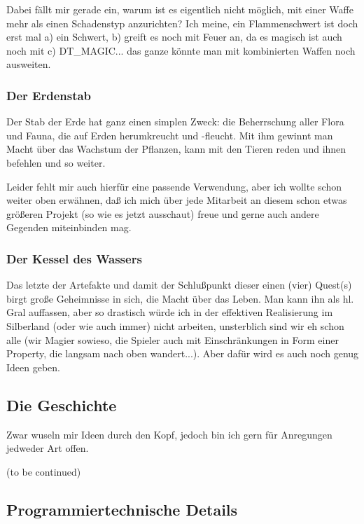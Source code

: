 \documentclass[10pt,a4paper,oneside,onecolumn]{article}
\begin{document}
Dabei fällt mir gerade ein, warum ist es eigentlich nicht möglich,
mit einer Waffe mehr als einen Schadenstyp anzurichten? Ich meine,
ein Flammenschwert ist doch erst mal a) ein Schwert, b) greift es
noch mit Feuer an, da es magisch ist auch noch mit c) DT\_MAGIC...
das ganze könnte man mit kombinierten Waffen noch ausweiten.


\subsubsection{Der Erdenstab}

Der Stab der Erde hat ganz einen simplen Zweck: die Beherrschung aller
Flora und Fauna, die auf Erden herumkreucht und -fleucht. Mit ihm
gewinnt man Macht über das Wachstum der Pflanzen, kann mit den Tieren
reden und ihnen befehlen und so weiter.

Leider fehlt mir auch hierfür eine passende Verwendung, aber ich wollte
schon weiter oben erwähnen, daß ich mich über jede Mitarbeit an diesem
schon etwas größeren Projekt (so wie es jetzt ausschaut) freue und
gerne auch andere Gegenden miteinbinden mag.


\subsubsection{Der Kessel des Wassers}

Das letzte der Artefakte und damit der Schlußpunkt dieser einen (vier)
Quest(s) birgt große Geheimnisse in sich, die Macht über das Leben.
Man kann ihn als hl. Gral auffassen, aber so drastisch würde ich in
der effektiven Realisierung im Silberland (oder wie auch immer) nicht
arbeiten, unsterblich sind wir eh schon alle (wir Magier sowieso,
die Spieler auch mit Einschränkungen in Form einer Property, die langsam
nach oben wandert...). Aber dafür wird es auch noch genug Ideen geben.


\subsection{Die Geschichte}

Zwar wuseln mir Ideen durch den Kopf, jedoch bin ich gern für Anregungen
jedweder Art offen.

(to be continued)


\subsection{Programmiertechnische Details}
\end{document}
